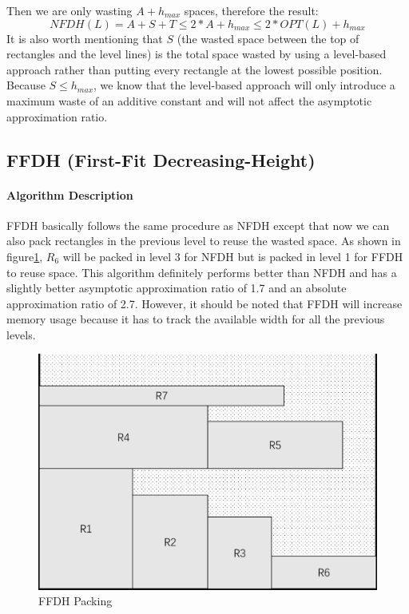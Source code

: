 \documentclass[sigplan,screen,nonacm]{acmart}\settopmatter{printfolios=true,printccs=false,printacmref=false}
\begin{document}
Then we are only wasting $A + h_{max}$ spaces, therefore the result: $$NFDH(L) = A+S+T \leq 2*A + h_{max} \leq 2*OPT(L) + h_{max}$$
It is also worth mentioning that $S$ (the wasted space between the top of rectangles and the level lines) is the total space wasted by using a level-based approach rather than putting every rectangle at the lowest possible position. Because $S \leq h_{max}$, we know that the level-based approach will only introduce a maximum waste of an additive constant and will not affect the asymptotic approximation ratio.
\subsection{FFDH (First-Fit Decreasing-Height)}
\paragraph*{Algorithm Description}
FFDH basically follows the same procedure as NFDH except that now we can also pack rectangles in the previous level to reuse the wasted space. As shown in figure\ref{fig:ffdhpacking}, $R_6$ will be packed in level 3 for NFDH but is packed in level 1 for FFDH to reuse space. This algorithm definitely performs better than NFDH and has a slightly better asymptotic approximation ratio of 1.7 and an absolute approximation ratio of 2.7. However, it should be noted that FFDH will increase memory usage because it has to track the available width for all the previous levels.
\begin{figure}[htbp]
  \centering
  \includegraphics[scale=0.4]{ffdh}
  \caption{FFDH Packing}
  \label{fig:ffdhpacking}
\end{figure}
\end{document}
